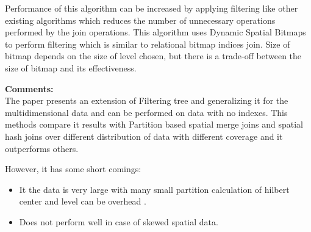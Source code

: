 \documentclass[a4paper,12pt, twoside]{article}
\begin{document}
Performance of this algorithm can be increased by applying filtering like other existing algorithms which reduces the number of unnecessary operations performed by the join operations. This algorithm uses Dynamic Spatial Bitmaps to perform filtering which is similar to relational bitmap indices join. Size of bitmap depends on the size of level chosen, but there is a trade-off between the size of bitmap and its effectiveness.

\textbf{Comments:}\\
The paper presents an extension of Filtering tree and generalizing it for the multidimensional data and can be performed on data with no indexes. This methods compare it results with Partition based spatial merge joins and spatial hash joins over different distribution of data with different coverage and it outperforms others.

However, it has some short comings:
\begin{itemize}
	\item It the data is very large with many small partition calculation of hilbert center and level can be overhead .
	
	\item Does not perform well in case of skewed spatial data.

\end{itemize}
\end{document}
